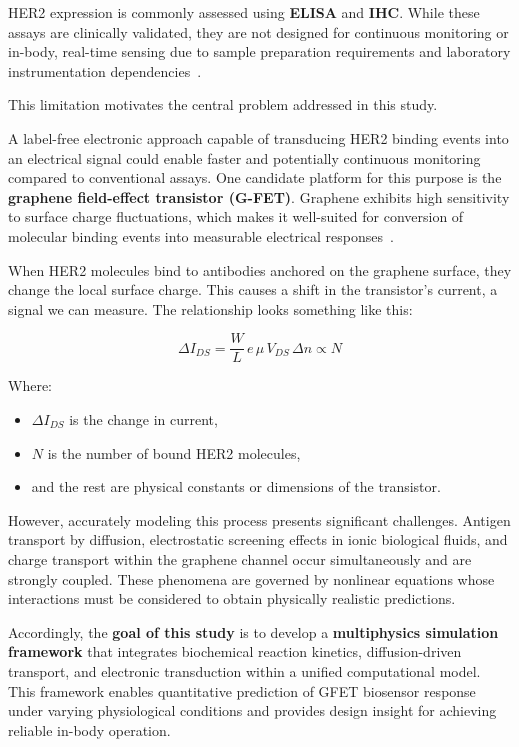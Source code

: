 \documentclass[12pt,a4paper]{report}
\begin{document}
HER2 expression is commonly assessed using \textbf{ELISA} and \textbf{IHC}. While these assays are clinically validated, they are not designed for continuous monitoring or in-body, real-time sensing due to sample preparation requirements and laboratory instrumentation dependencies~\cite{harpaz2017,janeway2001ch9}.


This limitation motivates the central problem addressed in this study.

A label-free electronic approach capable of transducing HER2 binding events into an electrical signal could enable faster and potentially continuous monitoring compared to conventional assays. One candidate platform for this purpose is the \textbf{graphene field-effect transistor (G-FET)}. Graphene exhibits high sensitivity to surface charge fluctuations, which makes it well-suited for conversion of molecular binding events into measurable electrical responses~\cite{bergveld1972,pena2018}.


When HER2 molecules bind to antibodies anchored on the graphene surface, they change the local surface charge. This causes a shift in the transistor’s current, a signal we can measure. The relationship looks something like this:

\begin{equation}
\Delta I_{DS} = \frac{W}{L} \, e \, \mu \, V_{DS} \, \Delta n \propto N
\end{equation}

Where:
\begin{itemize}
    \item $\Delta I_{DS}$ is the change in current,
    \item $N$ is the number of bound HER2 molecules,
    \item and the rest are physical constants or dimensions of the transistor.
\end{itemize}

However, accurately modeling this process presents significant challenges. Antigen transport by diffusion, electrostatic screening effects in ionic biological fluids, and charge transport within the graphene channel occur simultaneously and are strongly coupled. These phenomena are governed by nonlinear equations whose interactions must be considered to obtain physically realistic predictions.

Accordingly, the \textbf{goal of this study} is to develop a \textbf{multiphysics simulation framework} that integrates biochemical reaction kinetics, diffusion-driven transport, and electronic transduction within a unified computational model. This framework enables quantitative prediction of GFET biosensor response under varying physiological conditions and provides design insight for achieving reliable in-body operation.
\end{document}
